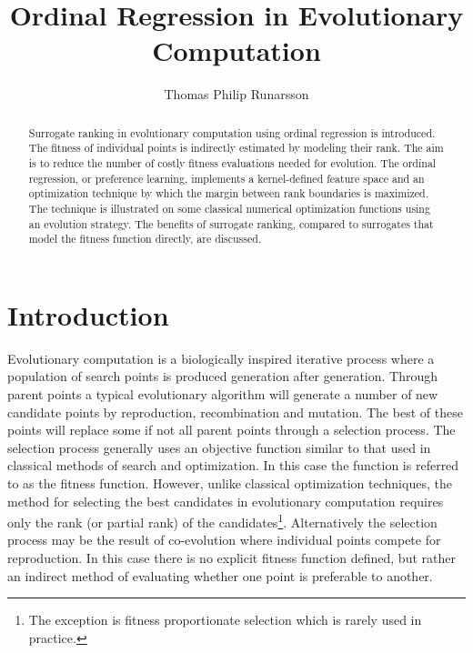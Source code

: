 \documentclass[10pt]{llncs}
\title{Ordinal Regression in Evolutionary Computation}
\author{Thomas Philip Runarsson}
\institute{{Science Institute, University of Iceland}\\
\email{tpr@hi.is}}
\begin{document}
\maketitle


\begin{abstract}
  Surrogate ranking in evolutionary computation using ordinal
  regression is introduced. The fitness of individual points is
  indirectly estimated by modeling their rank. The aim is to
  reduce the number of costly fitness evaluations needed for
  evolution. The ordinal regression, or preference learning,
  implements a kernel-defined feature space and an optimization
  technique by which the margin between rank boundaries is
  maximized.  The technique is illustrated on some classical
  numerical optimization functions using an evolution strategy.
  The benefits of surrogate ranking, compared to surrogates that
  model the fitness function directly, are discussed.
\end{abstract}

\section{Introduction}\label{sec:introduction}

Evolutionary computation is a biologically inspired iterative
process where a population of search points is produced
generation after generation. Through parent points a typical
evolutionary algorithm will generate a number of new candidate
points by reproduction, recombination and mutation. The best of
these points will replace some if not all parent points through
a selection process. The selection process generally uses an
objective function similar to that used in classical methods of
search and optimization. In this case the function is referred
to as the fitness function. However, unlike classical
optimization techniques, the method for selecting the best
candidates in evolutionary computation requires only the rank
(or partial rank) of the candidates\footnote{The exception is
  fitness proportionate selection which is rarely used in
  practice.}.  Alternatively the selection process may be the
result of co-evolution where individual points compete for
reproduction.  In this case there is no explicit fitness
function defined, but rather an indirect method of evaluating
whether one point is preferable to another.
\end{document}
